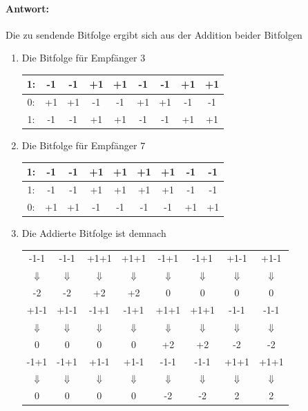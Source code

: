 \paragraph{Antwort:} Die zu sendende Bitfolge ergibt sich aus der Addition beider Bitfolgen
	\begin{enumerate}

	\item Die Bitfolge für Empfänger $3$
	
		\begin{tabular}{|c||c|c|c|c|c|c|c|c|}
		\hline 1: & -1 & -1 & +1 & +1 & -1 & -1 & +1 & +1 \\ 
		\hline 0: & +1 & +1 & -1 & -1 & +1 & +1 & -1 & -1 \\ 
		\hline 1: & -1 & -1 & +1 & +1 & -1 & -1 & +1 & +1 \\ 
		\hline 
		\end{tabular} 
	
	\item Die Bitfolge für Empfänger $7$
		
		\begin{tabular}{|c||c|c|c|c|c|c|c|c|}
		\hline 1: & -1 & -1 & +1 & +1 & +1 & +1 & -1 & -1 \\ 
		\hline 1: & -1 & -1 & +1 & +1 & +1 & +1 & -1 & -1 \\ 
		\hline 0: & +1 & +1 & -1 & -1 & -1 & -1 & +1 & +1 \\ 
		\hline 
		\end{tabular} 
		
	\item Die Addierte Bitfolge ist demnach
	
		\begin{tabular}{|c|c|c|c|c|c|c|c|}
		\hline -1-1 & -1-1 & +1+1 & +1+1 & -1+1 & -1+1 & +1-1 & +1-1 \\
		$\Downarrow$ & $\Downarrow$ & $\Downarrow$ & $\Downarrow$ & $\Downarrow$ & $\Downarrow$ & $\Downarrow$ & $\Downarrow$ \\
		-2 & -2 & +2 & +2 & 0 & 0 & 0 & 0 \\ 
		\hline +1-1 & +1-1 & -1+1 & -1+1 & +1+1 & +1+1 & -1-1 & -1-1 \\
		$\Downarrow$ & $\Downarrow$ & $\Downarrow$ & $\Downarrow$ & $\Downarrow$ & $\Downarrow$ & $\Downarrow$ & $\Downarrow$ \\
		0 & 0 & 0 & 0 & +2 & +2 & -2 & -2 \\ 
		\hline -1+1 & -1+1 & +1-1 & +1-1 & -1-1 & -1-1 & +1+1 & +1+1 \\ 
		$\Downarrow$ & $\Downarrow$ & $\Downarrow$ & $\Downarrow$ & $\Downarrow$ & $\Downarrow$ & $\Downarrow$ & $\Downarrow$ \\
		0 & 0 & 0 & 0 & -2 & -2 & 2 & 2 \\
		\hline 
		\end{tabular} 
	
	\end{enumerate}
